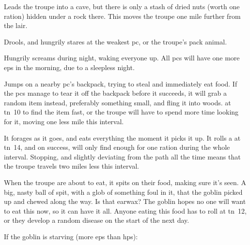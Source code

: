 \documentclass[10pt,twoside]{book}
\begin{document}
\begin{dlist}
  \item
  Leads the troupe into a cave, but there is only a stash of dried nuts (worth one \gls{ration}) hidden under a rock there.
  This moves the troupe one mile further from the lair.
  \item
  Drools, and hungrily stares at the weakest \gls{pc}, or the troupe's pack animal.
  \item
  Hungrily screams during night, waking everyone up.
  All \glspl{pc} will have one more \glspl{ep} in the morning, due to a sleepless night.
  \item
  Jumps on a nearby \gls{pc}'s backpack, trying to steal and immediately eat food.
  If the \glspl{pc} manage to tear it off the backpack before it succeeds, it will grab a random item instead, preferably something small, and fling it into woods.
   at \gls{tn}~10 to find the item fast, or the troupe will have to spend more time looking for it, moving one less mile this \gls{interval}.
  \item
  It forages as it goes, and eats everything the moment it picks it up.
  It rolls a  at \gls{tn}~14, and on success, will only find enough for one \gls{ration} during the whole \gls{interval}.
  Stopping, and slightly deviating from the path all the time means that the troupe travels two miles less this \gls{interval}.
  \item
  When the troupe are about to eat, it spits on their food, making sure it's seen.
  A big, nasty ball of spit, with a glob of something foul in it, that the goblin picked up and chewed along the way.
  Is that earwax?
  The goblin hopes no one will want to eat this now, so it can have it all.
  Anyone eating this food has to roll  at \gls{tn}~12, or they develop a random disease%
  on the start of the next day.
\end{dlist}

If the goblin is starving (more \glspl{ep} than \glspl{hp}):
\end{document}
